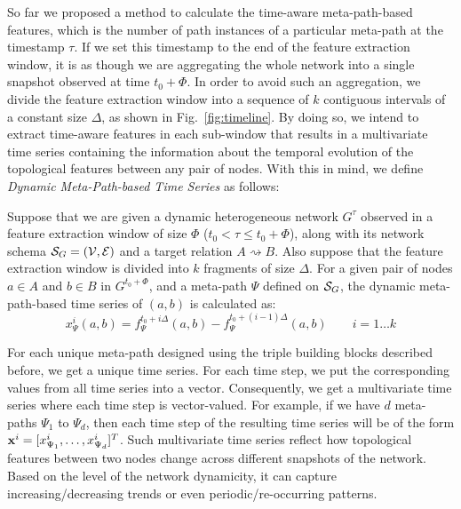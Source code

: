So far we proposed a method to calculate the time-aware meta-path-based features, which is the number of path instances of a particular meta-path at the timestamp $\tau$. If we set this timestamp to the end of the feature extraction window, it is as though we are aggregating the whole network into a single snapshot observed at time $t_0+\Phi$. In order to avoid such an aggregation, we divide the feature extraction window into a sequence of $k$ contiguous intervals of a constant size $\Delta$, as shown in Fig.~\ref{fig:timeline}. By doing so, we intend to extract time-aware features in each sub-window that results in a multivariate time series containing the information about the temporal evolution of the topological features between any pair of nodes. With this in mind, we define \emph{Dynamic Meta-Path-based Time Series} as follows:

\begin{definition}
	Suppose that we are given a dynamic heterogeneous network $G^{\tau}$ observed in a feature extraction window of size $\Phi$ ($t_0<\tau \le t_0+\Phi$), along with its network schema $\mathcal{S}_G=(\mathcal{V}, \mathcal{E})$ and a target relation $A\rightsquigarrow B$. Also suppose that the feature extraction window is divided into $k$ fragments of size $\Delta$. For a given pair of nodes $a\in A$ and $b\in B$ in $G^{t_0+\Phi}$, and a meta-path $\Psi$ defined on $\mathcal{S}_G$, the dynamic meta-path-based time series of $(a,b)$ is calculated as:
	\begin{equation*}
		x_{\Psi}^i(a,b)=f_{\Psi}^{t_0+i\Delta}(a,b) - f_{\Psi}^{t_0+(i-1)\Delta}(a,b)\quad\quad i=1\dots k
	\end{equation*}
\end{definition}

For each unique meta-path designed using the triple building blocks described before, we get a unique time series. For each time step, we put the corresponding values from all time series into a vector. Consequently, we get a multivariate time series where each time step is vector-valued. For example, if we have $d$ meta-paths $\Psi_1$ to $\Psi_d$, then each time step of the resulting time series will be of the form $\mathbf{x}^i=[x_{\Psi_1}^i,\dots,x_{\Psi_d}^i]^T$. Such multivariate time series reflect how topological features between two nodes change across different snapshots of the network. Based on the level of the network dynamicity, it can capture increasing/decreasing trends or even periodic/re-occurring patterns.

